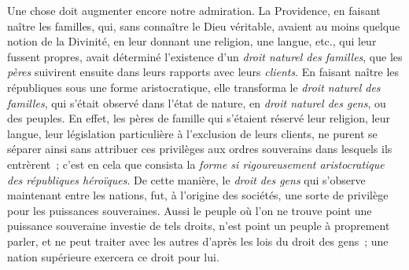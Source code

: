 \documentclass[french,twoside]{book} %
\begin{document}
Une chose doit augmenter encore notre admiration. La Providence, en faisant naître les familles, qui, sans connaître le Dieu véritable, avaient au moins quelque notion de la Divinité, en leur donnant une religion, une langue, etc., qui leur fussent propres, avait déterminé l’existence d’un {\itshape droit naturel des familles}, que les {\itshape pères} suivirent ensuite dans leurs rapports avec leurs {\itshape clients}. En faisant naître les républiques sous une forme aristocratique, elle transforma le {\itshape droit naturel des familles}, qui s’était observé dans l’état de nature, en {\itshape droit naturel des gens}, ou des peuples. En effet, les pères de famille qui s’étaient réservé leur religion, leur langue, leur législation particulière à l’exclusion de leurs clients, ne purent se séparer ainsi sans attribuer ces privilèges aux ordres souverains dans lesquels ils entrèrent ; c’est en cela que consista la {\itshape forme si rigoureusement aristocratique des républiques héroïques}. De cette manière, le {\itshape droit des gens} qui s’observe maintenant entre les nations, fut, à  l’origine des sociétés, une sorte de privilège pour les puissances souveraines. Aussi le peuple où l’on ne trouve point une puissance souveraine investie de tels droits, n’est point un peuple à proprement parler, et ne peut traiter avec les autres d’après les lois du droit des gens ; une nation supérieure exercera ce droit pour lui.
\end{document}
